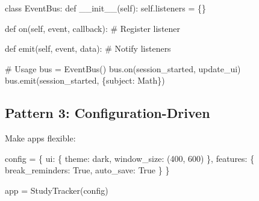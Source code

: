 \documentclass[
  letterpaper,
  DIV=11,
  numbers=noendperiod,
  oneside]{scrreprt}
\newenvironment{Shaded}{}{}
\newcommand{\CommentTok}[1]{\textcolor[rgb]{0.42,0.45,0.49}{#1}}
\newcommand{\DecValTok}[1]{\textcolor[rgb]{0.00,0.36,0.77}{#1}}
\newcommand{\FunctionTok}[1]{\textcolor[rgb]{0.44,0.26,0.76}{#1}}
\newcommand{\KeywordTok}[1]{\textcolor[rgb]{0.84,0.23,0.29}{#1}}
\newcommand{\NormalTok}[1]{\textcolor[rgb]{0.14,0.16,0.18}{#1}}
\newcommand{\OperatorTok}[1]{\textcolor[rgb]{0.14,0.16,0.18}{#1}}
\newcommand{\StringTok}[1]{\textcolor[rgb]{0.01,0.18,0.38}{#1}}
\newcommand{\VariableTok}[1]{\textcolor[rgb]{0.89,0.38,0.04}{#1}}
\begin{document}
\begin{Shaded}
\begin{Highlighting}[]
\KeywordTok{class}\NormalTok{ EventBus:}
    \KeywordTok{def} \FunctionTok{\_\_init\_\_}\NormalTok{(}\VariableTok{self}\NormalTok{):}
        \VariableTok{self}\NormalTok{.listeners }\OperatorTok{=}\NormalTok{ \{\}}
    
    \KeywordTok{def}\NormalTok{ on(}\VariableTok{self}\NormalTok{, event, callback):}
        \CommentTok{\# Register listener}
        
    \KeywordTok{def}\NormalTok{ emit(}\VariableTok{self}\NormalTok{, event, data):}
        \CommentTok{\# Notify listeners}

\CommentTok{\# Usage}
\NormalTok{bus }\OperatorTok{=}\NormalTok{ EventBus()}
\NormalTok{bus.on(}\StringTok{\textquotesingle{}session\_started\textquotesingle{}}\NormalTok{, update\_ui)}
\NormalTok{bus.emit(}\StringTok{\textquotesingle{}session\_started\textquotesingle{}}\NormalTok{, \{}\StringTok{\textquotesingle{}subject\textquotesingle{}}\NormalTok{: }\StringTok{\textquotesingle{}Math\textquotesingle{}}\NormalTok{\})}
\end{Highlighting}
\end{Shaded}

\subsection{Pattern 3:
Configuration-Driven}\label{pattern-3-configuration-driven}

Make apps flexible:

\begin{Shaded}
\begin{Highlighting}[]
\NormalTok{config }\OperatorTok{=}\NormalTok{ \{}
    \StringTok{\textquotesingle{}ui\textquotesingle{}}\NormalTok{: \{}
        \StringTok{\textquotesingle{}theme\textquotesingle{}}\NormalTok{: }\StringTok{\textquotesingle{}dark\textquotesingle{}}\NormalTok{,}
        \StringTok{\textquotesingle{}window\_size\textquotesingle{}}\NormalTok{: (}\DecValTok{400}\NormalTok{, }\DecValTok{600}\NormalTok{)}
\NormalTok{    \},}
    \StringTok{\textquotesingle{}features\textquotesingle{}}\NormalTok{: \{}
        \StringTok{\textquotesingle{}break\_reminders\textquotesingle{}}\NormalTok{: }\VariableTok{True}\NormalTok{,}
        \StringTok{\textquotesingle{}auto\_save\textquotesingle{}}\NormalTok{: }\VariableTok{True}
\NormalTok{    \}}
\NormalTok{\}}

\NormalTok{app }\OperatorTok{=}\NormalTok{ StudyTracker(config)}
\end{Highlighting}
\end{Shaded}
\end{document}
